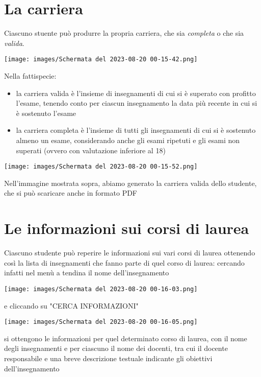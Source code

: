 \documentclass{article}
\begin{document}
    \section{La carriera}
    Ciascuno stuente può produrre la propria carriera, che sia \textit{completa} o che sia \textit{valida}.

    \texttt{[image: images/Schermata del 2023-08-20 00-15-42.png]}

    Nella fattispecie:
    \begin{itemize}
        \item la carriera valida è l'insieme di insegnamenti di cui si è superato con profitto l'esame, tenendo conto per ciascun insegnamento la data più recente in cui si è sostenuto l'esame
        \item  la carriera completa è l'insieme di tutti gli insegnamenti di cui si è sostenuto almeno un esame, considerando anche gli esami ripetuti e gli esami non superati (ovvero con valutazione inferiore al 18)
    \end{itemize}

    \texttt{[image: images/Schermata del 2023-08-20 00-15-52.png]}

    Nell'immagine mostrata sopra, abiamo generato la carriera valida dello studente, che si può scaricare anche in formato PDF

    \section{Le informazioni sui corsi di laurea}
    Ciascuno studente può reperire le informazioni sui vari corsi di laurea ottenendo così la lista di insegnamenti che fanno parte di quel corso di laurea: cercando infatti nel menù a tendina il nome dell'insegnamento

    \texttt{[image: images/Schermata del 2023-08-20 00-16-03.png]}

    e cliccando su "CERCA INFORMAZIONI"

    \texttt{[image: images/Schermata del 2023-08-20 00-16-05.png]}

    si ottengono le informazioni per quel determinato corso di laurea, con il nome degli insegnamenti e per ciascuno il nome dei docenti, tra cui il docente responsabile e una breve descrizione testuale indicante gli obiettivi dell'insegnamento
\end{document}
